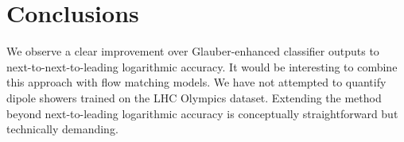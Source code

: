 \section{Conclusions}\label{sec:conclusions}

We observe a clear improvement over Glauber-enhanced classifier outputs
to next-to-next-to-leading logarithmic accuracy. It would be interesting
to combine this approach with flow matching models. We have not
attempted to quantify dipole showers trained on the LHC Olympics
dataset. Extending the method beyond next-to-leading logarithmic
accuracy is conceptually straightforward but technically demanding.

